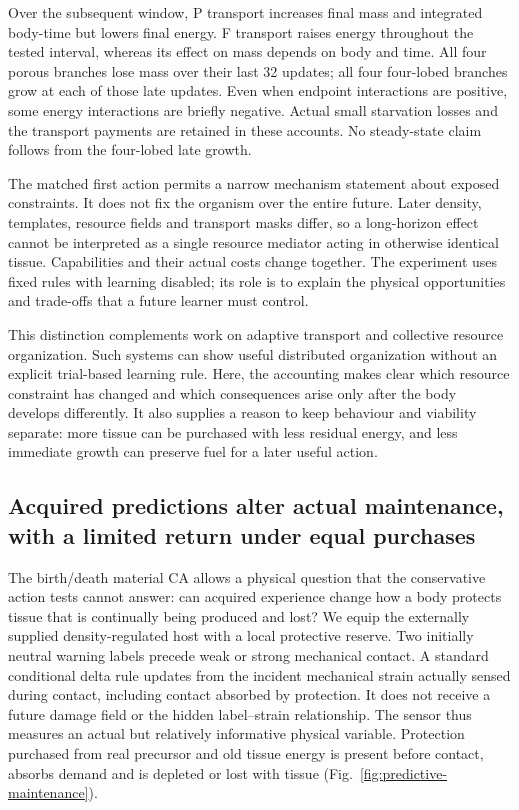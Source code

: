 

Over the subsequent window, P transport increases final mass and integrated body-time but lowers final energy. F transport raises energy throughout the tested interval, whereas its effect on mass depends on body and time. All four porous branches lose mass over their last 32 updates; all four four-lobed branches grow at each of those late updates. Even when endpoint interactions are positive, some energy interactions are briefly negative. Actual small starvation losses and the transport payments are retained in these accounts. No steady-state claim follows from the four-lobed late growth.

The matched first action permits a narrow mechanism statement about exposed constraints. It does not fix the organism over the entire future. Later density, templates, resource fields and transport masks differ, so a long-horizon effect cannot be interpreted as a single resource mediator acting in otherwise identical tissue. Capabilities and their actual costs change together. The experiment uses fixed rules with learning disabled; its role is to explain the physical opportunities and trade-offs that a future learner must control.

This distinction complements work on adaptive transport and collective resource organization\cite{tero,teronetwork,liu,prindle}. Such systems can show useful distributed organization without an explicit trial-based learning rule. Here, the accounting makes clear which resource constraint has changed and which consequences arise only after the body develops differently. It also supplies a reason to keep behaviour and viability separate: more tissue can be purchased with less residual energy, and less immediate growth can preserve fuel for a later useful action.


\subsection*{Acquired predictions alter actual maintenance, with a limited return under equal purchases}

The birth/death material CA allows a physical question that the conservative action tests cannot answer: can acquired experience change how a body protects tissue that is continually being produced and lost? We equip the externally supplied density-regulated host with a local protective reserve. Two initially neutral warning labels precede weak or strong mechanical contact. A standard conditional delta rule updates from the incident mechanical strain actually sensed during contact, including contact absorbed by protection. It does not receive a future damage field or the hidden label--strain relationship. The sensor thus measures an actual but relatively informative physical variable. Protection purchased from real precursor and old tissue energy is present before contact, absorbs demand and is depleted or lost with tissue (Fig.~\ref{fig:predictive-maintenance}).

